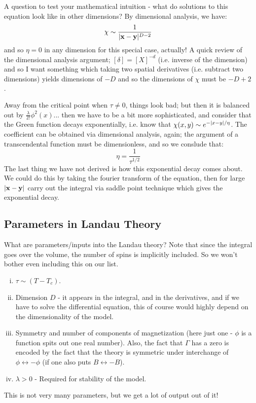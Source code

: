 A question to test your mathematical intuition - what do solutions to this equation look like in other dimensions? By dimensional analysis, we have:
\begin{equation}
    \chi \sim \frac{1}{\lvert \mathbf{x} - \mathbf{y} \rvert^{D - 2}}
\end{equation}
and so $\eta = 0$ in any dimension for this special case, actually! A quick review of the dimensional analysis argument; $[\delta] = [X]^{-d}$ (i.e. inverse of the dimension) and so I want something which taking two spatial derivatives (i.e. subtract two dimensions) yields dimensions of $-D$ and so the dimensions of $\chi$ must be $-D + 2$. 

Away from the critical point when $\tau \neq 0$, things look bad; but then it is balanced out by $\frac{\lambda}{2!}\phi^2(x)$... then we have to be a bit more sophisticated, and consider that the Green function decays exponentially, i.e. know that $\chi(x, y) \sim e^{-\lvert x-y \rvert/\eta}$. The coefficient can be obtained via dimensional analysis, again; the argument of a transcendental function must be dimensionless, and so we conslude that:
\begin{equation}
    \eta = \frac{1}{\tau^{1/2}}
\end{equation}
The last thing we have not derived is how this exponential decay comes about. We could do this by taking the fourier transform of the equation, then for large $\lvert \mathbf{x} - \mathbf{y} \rvert$ carry out the integral via saddle point technique which gives the exponential decay.

\subsection{Parameters in Landau Theory}
What are parameters/inputs into the Landau theory? Note that since the integral goes over the volume, the number of spins is implicitly included. So we won't bother even including this on our list. 
\begin{enumerate}[(i)]
    \item $\tau \sim (T - T_c)$.
    \item Dimension $D$ - it appears in the integral, and in the derivatives, and if we have to solve the differential equation, this of course would highly depend on the dimensionality of the model.
    \item Symmetry and number of components of magnetization (here just one - $\phi$ is a function spits out one real number). Also, the fact that $\Gamma$ has a zero is encoded by the fact that the theory is symmetric under interchange of $\phi \leftrightarrow -\phi$ (if one also puts $B \leftrightarrow -B$).
    \item $\lambda > 0$ - Required for stability of the model.
\end{enumerate}
This is not very many parameters, but we get a lot of output out of it!

